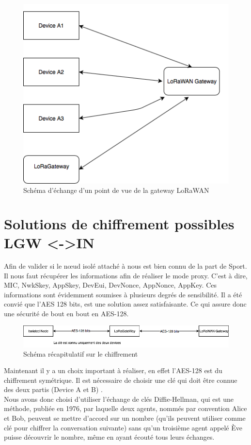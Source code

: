\documentclass[a4paper, 11pt]{article}
\begin{document}
\begin{figure}[!ht]    \centering
   \includegraphics[scale=1]{diag2.png} 
   \caption{Schéma d'échange d'un point de vue de la gateway LoRaWAN}
   \label{Schéma d'échange d'un point de vue de la gateway LoRaWAN}
\end{figure}

\newpage
\section*{Solutions de chiffrement possibles LGW <->IN}
Afin de valider si le n\oe{}ud isolé attaché à nous est bien connu de la part de Sport. Il nous faut récupérer les informations afin de réaliser le mode proxy. C'est à dire, MIC, NwkSkey, AppSkey, DevEui, DevNonce, AppNonce, AppKey. Ces informations sont évidemment soumises à plusieurs degrés de sensibilité. Il a été convié que l'AES 128 bits, est une solution assez satisfaisante. Ce qui assure donc une sécurité de bout en bout en AES-128.

\begin{figure}[!ht]    \centering
   \includegraphics[scale=0.6]{aes-128.png} 
   \caption{Schéma récapitulatif sur le chiffrement}
   \label{Schéma récapitulatif sur le chiffrement}
\end{figure}
Maintenant il y a un choix important à réaliser, en effet l'AES-128 est du chiffrement symétrique. Il est nécessaire de choisir une clé qui doit être connue des deux partis (Device A et B) . \\
Nous avons donc choisi d'utiliser l'échange de clés Diffie-Hellman, qui est une méthode, publiée en 1976, par laquelle deux agents, nommés par convention Alice et Bob, peuvent se mettre d'accord sur un nombre (qu'ils peuvent utiliser comme clé pour chiffrer la conversation suivante) sans qu'un troisième agent appelé Ève puisse découvrir le nombre, même en ayant écouté tous leurs échanges. \\
\end{document}
